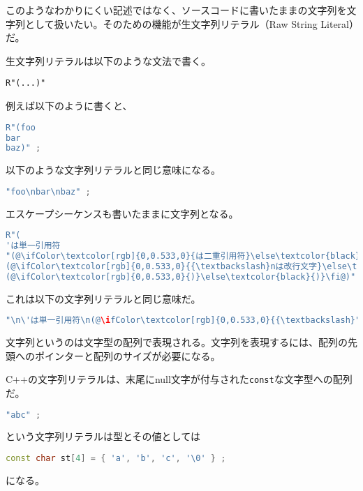 このようなわかりにくい記述ではなく、ソースコードに書いたままの文字列を文字列として扱いたい。そのための機能が生文字列リテラル（Raw String Literal）だ。

生文字列リテラルは以下のような文法で書く。

\begin{lstlisting}[style=grammar]
R"(...)"
\end{lstlisting}

例えば以下のように書くと、
\begin{lstlisting}[language={C++}]
R"(foo
bar
baz)" ;
\end{lstlisting}
\ifTombow\pagebreak\fi
以下のような文字列リテラルと同じ意味になる。
\begin{lstlisting}[language={C++}]
"foo\nbar\nbaz" ;
\end{lstlisting}

エスケープシーケンスも書いたままに文字列となる。

\begin{lstlisting}[language={C++}]
R"(
'は単一引用符
"(@\ifColor\textcolor[rgb]{0,0.533,0}{は二重引用符}\else\textcolor{black}{は二重引用符}\fi@)
(@\ifColor\textcolor[rgb]{0,0.533,0}{{\textbackslash}nは改行文字}\else\textcolor{black}{{\textbackslash}nは改行文字}\fi@)
(@\ifColor\textcolor[rgb]{0,0.533,0}{)}\else\textcolor{black}{)}\fi@)" ;
\end{lstlisting}

これは以下の文字列リテラルと同じ意味だ。

\begin{lstlisting}[language={C++}]
"\n\'は単一引用符\n(@\ifColor\textcolor[rgb]{0,0.533,0}{{\textbackslash}"は二重引用符}\else\textcolor{black}{{\textbackslash}"は二重引用符}\fi@)\n\\nは改行文字\n"
\end{lstlisting}


文字列というのは文字型の配列で表現される。文字列を表現するには、配列の先頭へのポインターと配列のサイズが必要になる。


C++の文字列リテラルは、末尾にnull文字が付与された\texttt{const}な文字型への配列だ。

\begin{lstlisting}[language={C++}]
"abc" ;
\end{lstlisting}
という文字列リテラルは型とその値としては
\begin{lstlisting}[language={C++}]
const char st[4] = { 'a', 'b', 'c', '\0' } ;
\end{lstlisting}
になる。

